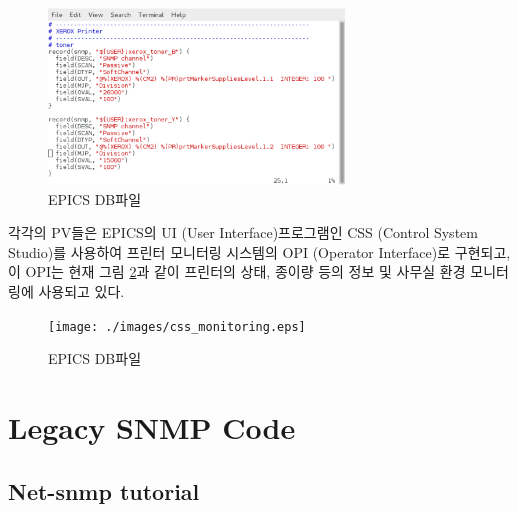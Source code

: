 \documentclass[11pt
  , a4paper
  , article
  , oneside
]{memoir}
\begin{document}
\begin{figure}[h!]
  \centering
  \includegraphics[width=0.7\textwidth]{./images/app.eps}
  \caption{EPICS DB파일}
  \label{fig:db}   
\end{figure}

\clearpage

각각의 PV들은 EPICS의 UI (User Interface)프로그램인 CSS (Control System Studio)를 사용하여 프린터 모니터링 시스템의 OPI (Operator Interface)로 구현되고, 이 OPI는 현재 그림 \ref{fig:css_monitoring}과 같이 프린터의 상태, 종이량 등의 정보 및 사무실 환경 모니터링에 사용되고 있다.

\begin{figure}[h!]
  \centering
  \texttt{[image: ./images/css\_monitoring.eps]}
  \caption{EPICS DB파일}
  \label{fig:css_monitoring}   
\end{figure}

\clearpage

\chapter{Legacy SNMP Code}
\section{Net-snmp tutorial}




\clearpage


\end{document}

